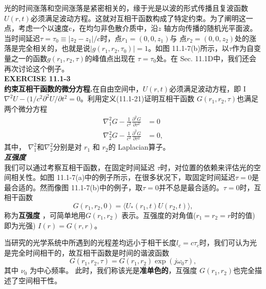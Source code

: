 \documentclass[UTF8]{ctexart}
\newcommand\crule[3][black]{\textcolor{#1}{\rule{#2}{#3}}}
\numberwithin{figure}{subsection}
\numberwithin{table}{subsection}
\begin{document}
\par 光的时间涨落和空间涨落是紧密相关的，缘于光是以波的形式传播且复波函数 $ U(r,t) $必须满足波动方程。这就对互相干函数构成了特定约束。为了阐明这一点，考虑一个以速度c，在均匀非色散介质中，沿$ z $ 轴方向传播的随机光平面波。当时间延迟$ \tau = \tau_0 \equiv \lvert z_2 - z_1 \rvert /c $时，点$ r_1 = (0, 0, z_1) $与 点$ r_2 = (0, 0, z_2) $处的涨落是完全相关的，也就是说$ \lvert g(r_1, r_2, \tau_0) \rvert = 1 $。如图 11.1-7(b)所示，以$ \tau $作为自变量之一的函数$ g(r_1, r_2, \tau) $的峰值点出现在 $ \tau = \tau_0 $处。在 Sec. 11.1D中，我们还会再次讨论这个例子。\\
\noindent{\crule[ksc]{\textwidth}{0.2cm}}
\textbf{EXERCISE 11.1-3} \\
\textbf{约束互相干函数的微分方程.}在自由空间中，$ U(r,t) $必须满足波动方程，即 I $ \nabla^2 U - (1/c^2  \partial^2 U / \partial t^2 = 0 $。利用定义(11.1-21)证明互相干函数  $ G(r_1, r_2, \tau) $也满足两个微分方程
\begin{subequations}
\begin{align}
\nabla_1^2 G - \frac{1}{c^2} \frac{\partial^2 G}{\partial \tau^2}  &= 0\\
\nabla_2^2 G - \frac{1}{c^2} \frac{\partial^2 G}{\partial \tau^2 } &= 0,
\end{align}
\end{subequations} 
其中， $ \nabla_1^2 $和$ \nabla_2^2 $分别是对 $ r_1 $ 和 $ r_2 $的 Laplacian算子。\\
\noindent{\crule[ksc]{\textwidth}{0.2cm}}
\bigbreak\noindent\textcolor{ksc}{\textbf{\textsl{互强度}}}\\
我们可以通过考察互相干函数，在固定时间延迟 $ \tau $时，对位置的依赖来评估光的空间相关性。如图 11.1-7(a)中的例子所示，在很多状况下，取固定时间延迟$ \tau = 0 $是最合适的。然而像图 11.1-7(b)中的例子，取$ \tau = 0 $并不总是最合适的。$ \tau = 0 $时，互相干函数
\begin{equation}
G(r_1, r_2, 0) = \langle U_\ast (r_1, t) U(r_2, t) \rangle ,
\end{equation}
称为\textbf{互强度} ，可简单地用$ G(r_1, r_2) $ 表示。互强度的对角值($ r_1 = r_2 = r $时的值) 即为光强) $ I(r) = G(r,r) $。
\par 当研究的光学系统中所遇到的光程差均远小于相干长度$ l_c = c\tau_c $时，我们可认为光是完全时间相干的，故互相干函数是时间的谐波函数
\begin{equation}
G(r_1, r_2, \tau) = G(r_1, r_2) \exp(j\omega_0 \tau),
\end{equation}
其中 $ \nu_0 $ 为中心频率。 此时，我们称该光是\textbf{准单色的}，互强度 $ G(r_1, r_2) $也完全描述了空间相干性。
\end{document}
